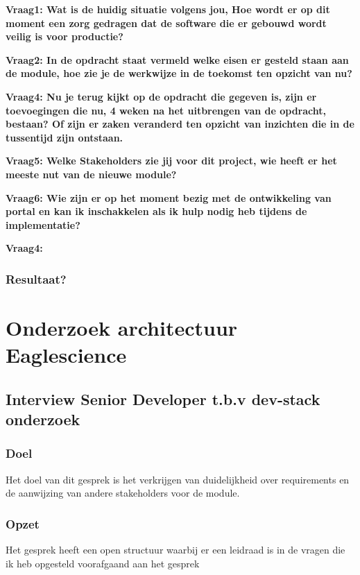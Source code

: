 \bigskip

\textbf{Vraag1: Wat is de huidig situatie volgens jou, Hoe wordt er op dit moment een zorg gedragen dat de software die er gebouwd wordt veilig is voor productie?}

\lipsum[01]
\bigskip

\textbf{Vraag2: In de opdracht staat vermeld welke eisen er gesteld staan aan de module, hoe zie je de werkwijze in de toekomst ten opzicht van nu?}

\lipsum[03]
\bigskip

\textbf{Vraag4: Nu je terug kijkt op de opdracht die gegeven is, zijn er toevoegingen die nu, 4 weken na het uitbrengen van de opdracht, bestaan? Of zijn er zaken veranderd ten opzicht van inzichten die in de tussentijd zijn ontstaan.}

\lipsum[05]
\bigskip

\textbf{Vraag5: Welke Stakeholders zie jij voor dit project, wie heeft er het meeste nut van de nieuwe module? }

\lipsum[06]
\bigskip

\textbf{Vraag6: Wie zijn er op het moment bezig met de ontwikkeling van portal en kan ik inschakkelen als ik hulp nodig heb tijdens de implementatie?}

\lipsum[09]
\bigskip

\textbf{Vraag4: }

\lipsum[07]

\subsubsection{Resultaat?}


\section{Onderzoek architectuur Eaglescience}
\subsection{Interview Senior Developer t.b.v dev-stack onderzoek}

\subsubsection{Doel}
Het doel van dit gesprek is het verkrijgen van duidelijkheid over requirements en de aanwijzing van andere stakeholders voor de module.

\subsubsection{Opzet}
Het gesprek heeft een open structuur waarbij er een leidraad is in de vragen die ik heb opgesteld voorafgaand aan het gesprek


